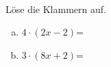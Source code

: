 \begin{aufgabe} ~ \\ 
Löse die Klammern auf.\begin{multicols}{2} 
\begin{enumerate}[a)] 
\item 
$4\cdot(2x-2)$=
\item 
$3\cdot(8x+2)$=
\end{enumerate} 
\end{multicols} 
\end{aufgabe} 
